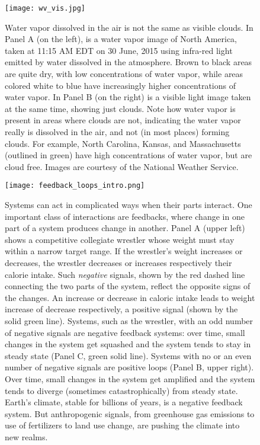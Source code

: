 \documentclass[amstex,12pt]{book}
\begin{document}
\begin{figure}[p]
\centering
\texttt{[image: wv\_vis.jpg]}%
\caption{Water vapor dissolved in the air is not the same as visible clouds. In Panel A (on the left), is a water vapor image of North America, taken at 11:15 AM EDT on 30 June, 2015 using infra-red light emitted by water dissolved in the atmosphere. Brown to black areas are quite dry, with low concentrations of water vapor, while areas colored white to blue have increasingly higher concentrations of water vapor. In Panel B (on the right) is a visible light image taken at the same time, showing just clouds. Note how water vapor is present in areas where clouds are not, indicating the water vapor really is dissolved in the air, and not (in most places) forming clouds. For example, North Carolina, Kansas, and Massachusetts (outlined in green) have high concentrations of water vapor, but are cloud free. Images are courtesy of the National Weather Service.}   
\label{fig:wv_vis}
\end{figure}

\begin{figure}[p]
\centering
\texttt{[image: feedback\_loops\_intro.png]}%
\caption{Systems can act in complicated ways when their parts interact. One important class of interactions are feedbacks, where change in one part of a system produces change in another. Panel A (upper left) shows a competitive collegiate wrestler whose weight must stay within a narrow target range. If the wrestler's weight increases or decreases, the wrestler decreases or increases respectively their calorie intake. Such \emph{negative} signals, shown by the red dashed line connecting the two parts of the system, reflect the opposite signs of the changes. An increase or decrease in caloric intake leads to weight increase of decrease respectively, a positive signal (shown by the solid green line). Systems, such as the wrestler, with an odd number of negative signals are negative feedback systems: over time, small changes in the system get squashed and the system tends to stay in steady state (Panel C, green solid line). Systems with no or an even number of negative signals are positive loops (Panel B, upper right). Over time, small changes in the system get amplified and the system tends to diverge (sometimes catastrophically) from steady state. Earth's climate, stable for billions of years, is a negative feedback system. But anthropogenic signals, from greenhouse gas emissions to use of fertilizers to land use change, are pushing the climate into new realms.}   
\label{fig:feedback_loops_intro}
\end{figure}
\end{document}
